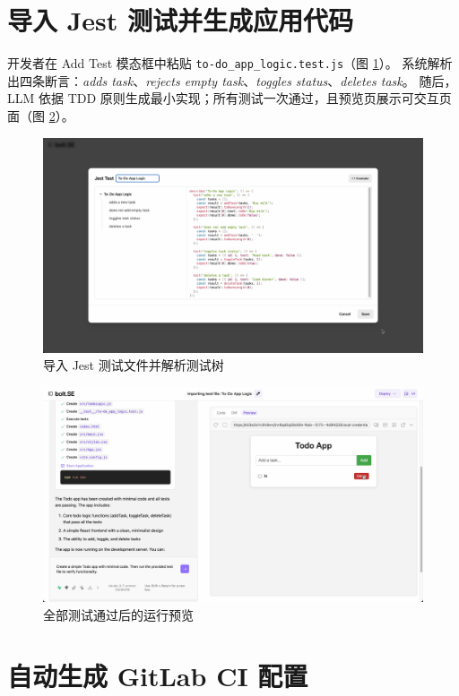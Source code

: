 \section{导入 Jest 测试并生成应用代码}

开发者在 Add Test 模态框中粘贴 \texttt{to-do\_app\_logic.test.js}（图 \ref{fig:jest_import}）。  
系统解析出四条断言：\textit{adds task}、\textit{rejects empty task}、\textit{toggles status}、\textit{deletes task}。  
随后，LLM 依据 TDD 原则生成最小实现；所有测试一次通过，且预览页展示可交互页面（图 \ref{fig:app_preview}）。

\begin{figure}
  \centering
  \includegraphics[width=\textwidth]{figures/screenshots/ci-cd/jest_import.png}
  \caption{导入 Jest 测试文件并解析测试树}
  \label{fig:jest_import}
\end{figure}

\begin{figure}
  \centering
  \includegraphics[width=.8\textwidth]{figures/screenshots/ci-cd/app_preview.png}
  \caption{全部测试通过后的运行预览}
  \label{fig:app_preview}
\end{figure}

\section{自动生成 GitLab CI 配置}
\label{sec:cicd-ci-yml}


